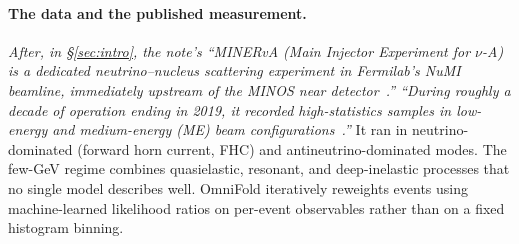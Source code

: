 \paragraph{The data and the published measurement.} \emph{After, in \S\ref{sec:intro}, the note's ``MINERvA (Main Injector Experiment for $\nu$-A) is a dedicated neutrino--nucleus scattering experiment in Fermilab's NuMI beamline, immediately upstream of the MINOS near detector~\cite{MINERvA:2013zvz}.'' ``During roughly a decade of operation ending in 2019, it recorded high-statistics samples in low-energy and medium-energy (ME) beam configurations~\cite{MINERvA:2016iqn}.''} It ran in neutrino-dominated (forward horn current, FHC) and antineutrino-dominated modes. The few-GeV regime combines quasielastic, resonant, and deep-inelastic processes that no single model describes well. OmniFold iteratively reweights events using machine-learned likelihood ratios on per-event observables rather than on a fixed histogram binning.

